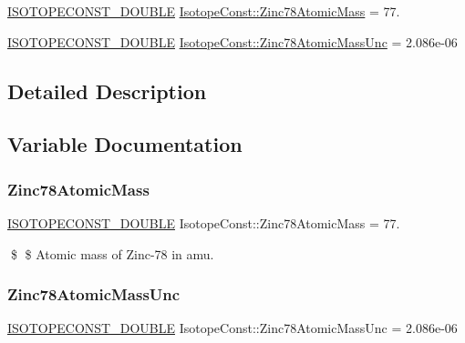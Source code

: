 \begin{DoxyCompactItemize}
\item 
\mbox{\hyperlink{group___isotope_const-_macros_ga8f45a7272ce02c0b4c65c44636ed719a}{I\+S\+O\+T\+O\+P\+E\+C\+O\+N\+S\+T\+\_\+\+D\+O\+U\+B\+LE}} \mbox{\hyperlink{group___isotope_const-_zinc-_zn78_gaa561ab3ab5de5644941877b61e2da5e2}{Isotope\+Const\+::\+Zinc78\+Atomic\+Mass}} = 77.
\item 
\mbox{\hyperlink{group___isotope_const-_macros_ga8f45a7272ce02c0b4c65c44636ed719a}{I\+S\+O\+T\+O\+P\+E\+C\+O\+N\+S\+T\+\_\+\+D\+O\+U\+B\+LE}} \mbox{\hyperlink{group___isotope_const-_zinc-_zn78_gafdedf2bd55c0eeb9f41dca117c9c139c}{Isotope\+Const\+::\+Zinc78\+Atomic\+Mass\+Unc}} = 2.\+086e-\/06
\end{DoxyCompactItemize}


\subsection{Detailed Description}


\subsection{Variable Documentation}
\mbox{\label{group___isotope_const-_zinc-_zn78_gaa561ab3ab5de5644941877b61e2da5e2}} 
\subsubsection{\texorpdfstring{Zinc78\+Atomic\+Mass}{Zinc78AtomicMass}}
{\footnotesize\ttfamily \mbox{\hyperlink{group___isotope_const-_macros_ga8f45a7272ce02c0b4c65c44636ed719a}{I\+S\+O\+T\+O\+P\+E\+C\+O\+N\+S\+T\+\_\+\+D\+O\+U\+B\+LE}} Isotope\+Const\+::\+Zinc78\+Atomic\+Mass = 77.}

\$ \$ Atomic mass of Zinc-\/78 in amu. \mbox{\label{group___isotope_const-_zinc-_zn78_gafdedf2bd55c0eeb9f41dca117c9c139c}} 
\subsubsection{\texorpdfstring{Zinc78\+Atomic\+Mass\+Unc}{Zinc78AtomicMassUnc}}
{\footnotesize\ttfamily \mbox{\hyperlink{group___isotope_const-_macros_ga8f45a7272ce02c0b4c65c44636ed719a}{I\+S\+O\+T\+O\+P\+E\+C\+O\+N\+S\+T\+\_\+\+D\+O\+U\+B\+LE}} Isotope\+Const\+::\+Zinc78\+Atomic\+Mass\+Unc = 2.\+086e-\/06}

